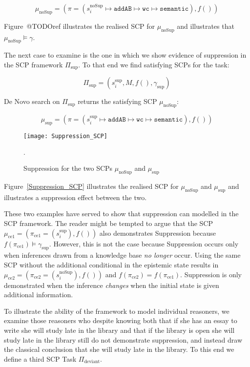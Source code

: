 \[\mu_\text{noSup}=(\pi=(s_i^{\text{noSup}} \longmapsto \texttt{addAB} \longmapsto \texttt{wc} \longmapsto \texttt{semantic}),f())\]

Figure~@TODOref illustrates the realised SCP for $\mu_\text{noSup}$ and illustrates that $\mu_\text{noSup} \models \gamma$.

The next case to examine is the one in which we show evidence of suppression in the SCP framework $\Pi_\text{sup}$. To that end we find satisfying SCPs for the task:

\[\Pi_\text{sup}=(s_i^{\text{sup}},M,f(),\gamma_{\text{sup}})\]

De Novo search on $\Pi_\text{sup}$ returns the satisfying SCP $\mu_\text{noSup}$:

\[\mu_\text{sup}=(\pi=(s_i^{\text{sup}} \longmapsto \texttt{addAB} \longmapsto \texttt{wc} \longmapsto \texttt{semantic}),f())\]

\begin{figure}
\centering \texttt{[image: Suppression\_SCP]}
\caption{Suppression for the two SCPs $\mu_\text{noSup}$ and $\mu_\text{sup}$}.
\label{fig:Suppression_SCP}
\end{figure}

Figure~\ref{Suppression_SCP} illustrates the realised SCP for $\mu_\text{noSup}$ and $\mu_\text{sup}$ and illustrates a suppression effect between the two.

These two examples have served to show that suppression can modelled in the SCP framework. The reader might be tempted to argue that the SCP $\mu_\text{ce1} = (\pi_\text{ce1}=(s^\text{sup}_i),f())$ also demonstrates Suppression because $f(\pi_\text{ce1})\models \gamma_\text{sup}$. However, this is not the case because Suppression occurs only when inferences drawn from a knowledge base \textit{no longer} occur. Using the same SCP without the additional conditional in the epistemic state results in $\mu_\text{ce2} = (\pi_\text{ce2}=(s^\text{noSup}_i),f())$ and $f(\pi_\text{ce2})=f(\pi_\text{ce1})$. Suppression is only demonstrated when the inference \textit{changes} when the initial state is given additional information.

To illustrate the ability of the framework to model individual reasoners, we examine those reasoners who despite knowing both that if she has an essay to write she will study late in the library and that if the library is open she will study late in the library still do not demonstrate suppression, and instead draw the classical conclusion that she will study late in the library. To this end we define a third SCP Task $\Pi_\text{deviant}$.

